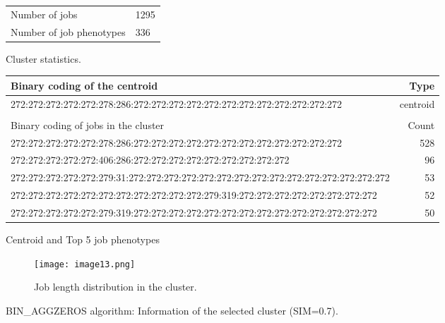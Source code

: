 \documentclass{jhps}
\begin{document}
\begin{figure}
	\begin{subtable}{\textwidth}
		\centering
		\begin{tabular}{ll}
			\centering
			Number of jobs & 1295 \\
			Number of job phenotypes & 336 \\
		\end{tabular}
		\caption{Cluster statistics.}
		\label{cluster:bin_aggzeros:stats}
	\end{subtable}
	\medskip
	\begin{subtable}{\textwidth}
		\centering
		\begin{tiny}
			\begin{tabular}{l|r}
				\rowcolor{tblhead}
				Binary coding of the centroid                                                                         &  Type     \\
				\hline
				272:272:272:272:272:278:286:272:272:272:272:272:272:272:272:272:272:272:272            &  centroid \\
				\multicolumn{2}{l}{}                                                                   \\
				\hline
				\rowcolor{tblhead}
				Binary coding of jobs in the cluster                                                                          &  Count    \\
				272:272:272:272:272:278:286:272:272:272:272:272:272:272:272:272:272:272:272            &  528      \\
				272:272:272:272:272:406:286:272:272:272:272:272:272:272:272:272                        &  96       \\
				272:272:272:272:272:279:31:272:272:272:272:272:272:272:272:272:272:272:272:272:272:272 &  53       \\
				272:272:272:272:272:272:272:272:272:272:272:279:319:272:272:272:272:272:272:272:272    &  52       \\
				272:272:272:272:272:279:319:272:272:272:272:272:272:272:272:272:272:272:272:272:272    &  50       \\
			\end{tabular}
		\end{tiny}
		\caption{Centroid and Top 5 job phenotypes}
		\label{cluster:bin_aggzeros:top_jobs}
	\end{subtable}
	\medskip
	\begin{subfigure}{\textwidth}
		\centering
		\texttt{[image: image13.png]}
		\caption{Job length distribution in the cluster.}
		\label{cluster:bin_aggzeros:length}
	\end{subfigure}
	\caption{BIN\_AGGZEROS algorithm: Information of the selected cluster (SIM=0.7).}
	\label{cluster:bin_aggzeros}
\end{figure}
\end{document}
